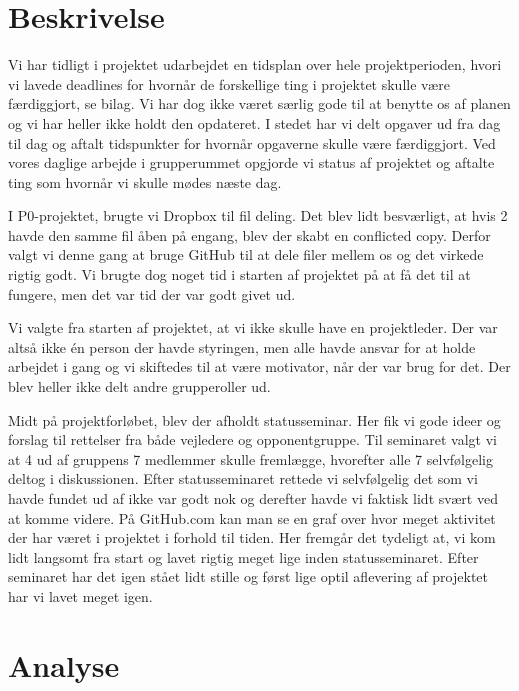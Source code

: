 \section{Beskrivelse}
Vi har tidligt i projektet udarbejdet en tidsplan over hele projektperioden, hvori vi lavede deadlines for hvornår de forskellige ting i projektet skulle være færdiggjort, se bilag. Vi har dog ikke været særlig gode til at benytte os af planen og vi har heller ikke holdt den opdateret. I stedet har vi delt opgaver ud fra dag til dag og aftalt tidspunkter for hvornår opgaverne skulle være færdiggjort. Ved vores daglige arbejde i grupperummet opgjorde vi status af projektet og aftalte ting som hvornår vi skulle mødes næste dag. 

I P0-projektet, brugte vi Dropbox til fil deling. Det blev lidt besværligt, at hvis 2 havde den samme fil åben på engang, blev der skabt en conflicted copy. Derfor valgt vi denne gang at bruge GitHub til at dele filer mellem os og det virkede rigtig godt. Vi brugte dog noget tid i starten af projektet på at få det til at fungere, men det var tid der var godt givet ud. 

Vi valgte fra starten af projektet, at vi ikke skulle have en projektleder. Der var altså ikke én person der havde styringen, men alle havde ansvar for at holde arbejdet i gang og vi skiftedes til at være motivator, når der var brug for det. Der blev heller ikke delt andre grupperoller ud.  

Midt på projektforløbet, blev der afholdt statusseminar. Her fik vi gode ideer og forslag til rettelser fra både vejledere og opponentgruppe. Til seminaret valgt vi at 4 ud af gruppens 7 medlemmer skulle fremlægge, hvorefter alle 7 selvfølgelig deltog i diskussionen. Efter statusseminaret rettede vi selvfølgelig det som vi havde fundet ud af ikke var godt nok og derefter havde vi faktisk lidt svært ved at komme videre. På GitHub.com kan man se en graf over hvor meget aktivitet der har været i projektet i forhold til tiden. Her fremgår det tydeligt at, vi kom lidt langsomt fra start og lavet rigtig meget lige inden statusseminaret. Efter seminaret har det igen stået lidt stille og først lige optil aflevering af projektet har vi lavet meget igen. 

\section{Analyse}

